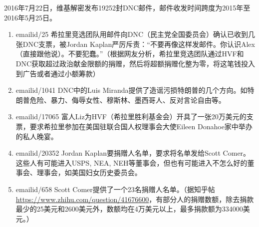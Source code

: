 2016年7月22日，维基解密发布19252封DNC邮件，邮件收发时间跨度为2015年至2016年5月25日。
\begin{enumerate}
  \item emailid/25 希拉里竞选团队用邮件向DNC（民主党全国委员会）确认已收到几张DNC支票，被Jordan Kaplan严厉斥责：“不要再像这样发邮件。你认识Alex（直接跟他说）。不要犯蠢。”（根据网友分析，希拉里竞选团队通过HVF和DNC获取超过政治献金限额的捐赠，然后将超额捐赠化整为零，将这笔钱投入到广告或者通过小额筹款）
    
    \item emailid/1041 DNC中的Luis Miranda提供了造谣污损特朗普的几个方向。如特朗普危险、暴力、侮辱女性、穆斯林、墨西哥人、反对言论自由等。

      \item emailid/17065 富人Liz为HVF（希拉里胜利基金会）开具了一张20万美元的支票，要求希拉里参加在美国驻联合国人权理事会大使Eileen Donahoe家中举办的私人晚宴。
        
  \item emailid/20352 Jordan Kaplan要捐赠人名单，要求将名单发给Scott Comer。这些人有可能进入USPS, NEA, NEH等董事会，但也有可能进入不怎么好的董事会、理事会，如美国妇女历史委员会。

  \item emailid/658 Scott Comer提供了一个23名捐赠人名单。（据知乎帖 \url{https://www.zhihu.com/question/41676600}，有部分人的捐赠数额，除去捐款最少的25美元和2600美元外，数额均在4万美元以上，最多捐款额为334000美元。）
\end{enumerate}

